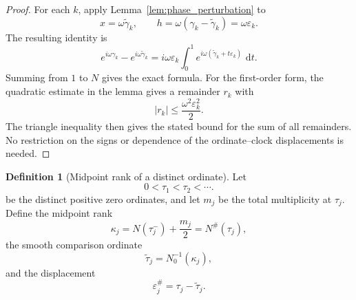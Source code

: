 \documentclass[11pt]{amsart}
\numberwithin{equation}{section}
\theoremstyle{plain}
\theoremstyle{definition}
\newtheorem{definition}[theorem]{Definition}
\theoremstyle{remark}
\newcommand{\1}{\mathbf{1}}
\newcommand{\dd}{\,\mathrm{d}}
\begin{document}
\begin{proof}
For each \(k\), apply Lemma~\ref{lem:phase_perturbation} to
\begin{equation}
x=\omega\widetilde\gamma_k,
\qquad
h=\omega(\gamma_k-\widetilde\gamma_k)=\omega\varepsilon_k.
\label{eq:indexed_discrepancy_substitution}
\end{equation}
The resulting identity is
\begin{equation}
e^{i\omega\gamma_k}-e^{i\omega\widetilde\gamma_k}
=
i\omega\varepsilon_k
\int_0^1e^{i\omega(\widetilde\gamma_k+t\varepsilon_k)}\,\dd t.
\label{eq:indexed_discrepancy_termwise}
\end{equation}
Summing from \(1\) to \(N\) gives the exact formula.  For the first-order
form, the quadratic estimate in the lemma gives a remainder \(r_k\) with
\begin{equation}
|r_k|\leq\frac{\omega^2\varepsilon_k^2}{2}.
\label{eq:indexed_term_remainder_bound}
\end{equation}
The triangle inequality then gives the stated bound for the sum of all
remainders.  No restriction on the signs or dependence of the ordinate--clock displacements
is needed.
\end{proof}

\begin{definition}[Midpoint rank of a distinct ordinate]
\label{def:midpoint_rank_distinct_ordinate}
Let
\begin{equation}
0<\tau_1<\tau_2<\cdots.
\label{eq:distinct_ordinate_order}
\end{equation}
be the distinct positive zero ordinates, and let \(m_j\) be the total
multiplicity at \(\tau_j\).  Define the midpoint rank
\begin{equation}
\kappa_j
=
N(\tau_j^-)+\frac{m_j}{2}
=
N^{\#}(\tau_j),
\label{eq:midpoint_rank_distinct_ordinate}
\end{equation}
the smooth comparison ordinate
\begin{equation}
\widetilde\tau_j
=
N_0^{-1}(\kappa_j),
\label{eq:smooth_distinct_ordinate}
\end{equation}
and the displacement
\begin{equation}
\varepsilon_j^{\#}
=
\tau_j-\widetilde\tau_j.
\label{eq:distinct_ordinate_displacement}
\end{equation}
\end{definition}
\end{document}
